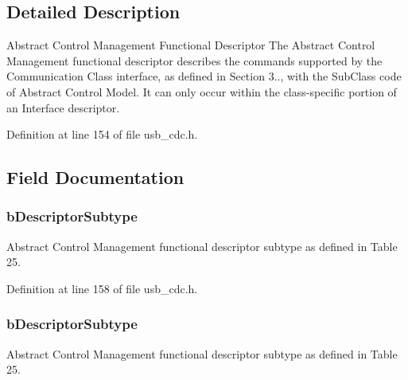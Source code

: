 \subsection{Detailed Description}
Abstract Control Management Functional Descriptor The Abstract Control Management functional descriptor describes the commands supported by the Communication Class interface, as defined in Section 3.., with the Sub\-Class code of Abstract Control Model. It can only occur within the class-\/specific portion of an Interface descriptor. 

Definition at line 154 of file usb\-\_\-cdc.\-h.



\subsection{Field Documentation}
\hypertarget{struct_u_s_b___abstract___control___management___functional___descriptor_a647561cc46bc5a0d3e0d9e962c43c605}{
\subsubsection[{b\-Descriptor\-Subtype}]{ b\-Descriptor\-Subtype}}\label{struct_u_s_b___abstract___control___management___functional___descriptor_a647561cc46bc5a0d3e0d9e962c43c605}
Abstract Control Management functional descriptor subtype as defined in Table 25. 

Definition at line 158 of file usb\-\_\-cdc.\-h.

\hypertarget{struct_u_s_b___abstract___control___management___functional___descriptor_a8ad9638618bb89c49f9c1490311ab1d5}{
\subsubsection[{b\-Descriptor\-Subtype}]{ b\-Descriptor\-Subtype}}\label{struct_u_s_b___abstract___control___management___functional___descriptor_a8ad9638618bb89c49f9c1490311ab1d5}
Abstract Control Management functional descriptor subtype as defined in Table 25. 

